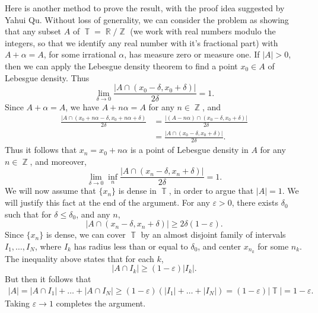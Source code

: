 \documentclass[answers]{exam}
\DeclareMathOperator{\RR}{\mathbb{R}}
\DeclareMathOperator{\ZZ}{\mathbb{Z}}
\DeclareMathOperator{\TT}{\mathbb{T}}
\theoremstyle{problemstyle}
\newcommand{\1}[1]{\textbf{1}_{\left[#1\right]}} %
\begin{document}
\begin{questions}
\begin{solution}
	Here is another method to prove the result, with the proof idea suggested by Yahui Qu. Without loss of generality, we can consider the problem as showing that any subset $A$ of $\TT = \RR / \ZZ$ (we work with real numbers modulo the integers, so that we identify any real number with it's fractional part) with $A + \alpha = A$, for some irrational $\alpha$, has measure zero or measure one. If $|A| > 0$, then we can apply the Lebesgue density theorem to find a point $x_0 \in A$ of Lebesgue density. Thus
	\[ \lim_{\delta \to 0} \frac{|A \cap (x_0 - \delta, x_0 + \delta)|}{2 \delta} = 1. \]
	Since $A + \alpha = A$, we have $A + n\alpha = A$ for any $n \in \ZZ$, and
	\begin{align*}
		\frac{|A \cap (x_0 + n \alpha - \delta, x_0 + n \alpha + \delta)}{2 \delta} &= \frac{|(A - n \alpha) \cap (x_0 - \delta, x_0 + \delta)|}{2 \delta}\\
		&= \frac{|A \cap (x_0 - \delta, x_0 + \delta)|}{2 \delta}.
	\end{align*}
	Thus it follows that $x_n = x_0 + n \alpha$ is a point of Lebesgue density in $A$ for any $n \in \ZZ$, and moreover,
	\[ \lim_{\delta \to 0} \inf_n \frac{|A \cap (x_n - \delta, x_n + \delta)|}{2 \delta} = 1. \]
	We will now assume that $\{ x_n \}$ is dense in $\TT$, in order to argue that $|A| = 1$. We will justify this fact at the end of the argument. For any $\varepsilon > 0$, there exists $\delta_0$ such that for $\delta \leq \delta_0$, and any $n$,
	\[  |A \cap (x_n - \delta, x_n + \delta)| \geq 2 \delta (1 - \varepsilon). \]
	Since $\{ x_n \}$ is dense, we can cover $\TT$ by an almost disjoint family of intervals $I_1,\dots,I_N$, where $I_k$ has radius less than or equal to $\delta_0$, and center $x_{n_k}$ for some $n_k$. The inequality above states that for each $k$,
	\[ |A \cap I_k| \geq (1 - \varepsilon) |I_k|. \]
	But then it follows that
	\begin{align*}
		|A| = |A \cap I_1| + \dots + |A \cap I_N| \geq (1 - \varepsilon) (|I_1| + \dots + |I_N|) = (1 - \varepsilon) |\TT| = 1 - \varepsilon.
	\end{align*}
	Taking $\varepsilon \to 1$ completes the argument.


\end{solution}
\end{questions}
\end{document}
